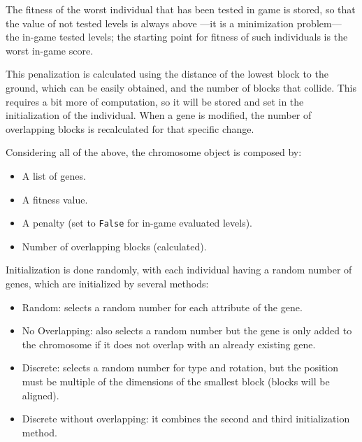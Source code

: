 \documentclass[sigconf]{acmart}
\begin{document}
The fitness of the worst individual that has been tested in game is
stored, so that the value of not tested levels is always above ---it is a minimization problem--- the in-game 
tested levels; the starting point for fitness of such individuals is the 
worst in-game score.

This penalization is calculated using the distance of the lowest block to the 
ground, which can be easily obtained, and the number of blocks that collide. 
This requires a bit more of computation, so it will be stored and set in the 
initialization of the individual. When a gene is modified, the number of 
overlapping blocks is recalculated for that specific change.

Considering all of the above, the chromosome object is composed by:
\begin{itemize}
	\item A list of genes.
	\item A fitness value.
	\item A penalty (set to {\tt False} for in-game evaluated levels).
	\item Number of overlapping blocks (calculated).
\end{itemize} %


Initialization is done randomly, with each individual having a random number of 
genes, which are initialized by several methods: 

\begin{itemize}
	\item Random: selects a random number for each attribute of the gene.
	\item No Overlapping: also selects a random number but the gene is only 
	added to the chromosome if it does not overlap with an already existing 
	gene.
	\item Discrete: selects a random number for type and rotation, but the 
	position must be multiple of the dimensions of the smallest block (blocks 
	will be aligned).
	\item Discrete without overlapping: it combines the second and third 
	initialization method.
\end{itemize}
\end{document}
